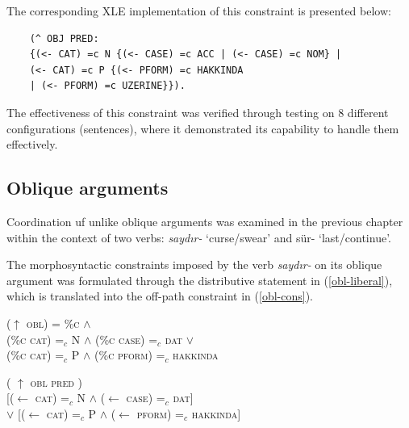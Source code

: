 The corresponding XLE implementation of this constraint is presented below:

\pex
\label{imp:xlekonuş_modified}
\vspace{-18pt}

\begin{lstlisting}
    (^ OBJ PRED:
    {(<- CAT) =c N {(<- CASE) =c ACC | (<- CASE) =c NOM} |
    (<- CAT) =c P {(<- PFORM) =c HAKKINDA 
    | (<- PFORM) =c UZERINE}}).
\end{lstlisting}
\xe

The effectiveness of this constraint was verified through testing on 8 different configurations (sentences), where it demonstrated its capability to handle them effectively.

\subsection{Oblique arguments}

Coordination uf unlike oblique arguments was examined in the previous chapter within the context of two verbs: \textit{saydır-} `curse/swear' and sür- `last/continue'.

The morphosyntactic constraints imposed by the verb \textit{saydır-} on its oblique argument was formulated through the distributive statement in (\ref{obl-liberal}), which is translated into the off-path constraint in (\ref{obl-cons}).

\ex
\label{obl-liberal}
($\uparrow$ \textsc{obl}) = \%\textsc{c} $\land$ \\
\vspace{3pt}\text{[[}(\%\textsc{c cat}) =$_c$ N $\land$ (\%\textsc{c case}) =$_c$ \textsc{dat}\text{]} $\lor$ \\
\text{[}(\%\textsc{c cat}) =$_c$ P $\land$ (\%\textsc{c pform}) =$_c$ \textsc{hakkinda}\text{]]}
\xe

\ex
\label{obl-cons}
( $\uparrow$  \textsc{obl} \hspace*{8em} \textsc{pred} \hspace*{11.3em}) \\
\hspace*{6.2em} [($\leftarrow$ \textsc{cat}) =$_{c}$ N \hspace*{.4em} $\land$ \hspace*{.4em} ($\leftarrow$ \textsc{case}) =$_{c}$ \textsc{dat}] \\
\hspace*{3.5em} $\lor$ [($\leftarrow$ \textsc{cat}) =$_{c}$ P \hspace*{.4em} $\land$ \hspace*{.4em} ($\leftarrow$ \textsc{pform}) =$_{c}$ \textsc{hakkında}]
\xe

